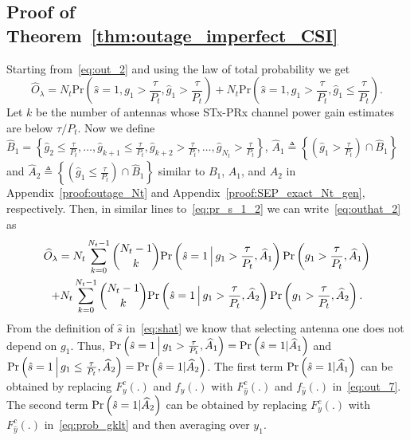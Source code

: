 \documentclass[12pt,draftcls,peerreview,onecolumn]{IEEEtran}
\newcommand{\brac}[1]{\left({#1}\right)}
\newcommand{\define}{\triangleq}
\newcommand{\prob}[1]{\text{Pr}\brac{#1}}
\newcommand{\given}{\arrowvert}
\newcommand{\Given}{\Big\arrowvert}
\newcommand{\nck}[2]{\binom{#1}{#2}}
\newcommand{\setB}{B_1}
\newcommand{\setBhat}{\widehat{B}_1}
\newcommand{\setAgt}{A_1}
\newcommand{\setAlt}{A_2}
\newcommand{\setAgthat}{\widehat{A}_1}
\newcommand{\setAlthat}{\widehat{A}_2}
\newcommand{\lam}{\lambda}
\newcommand{\Nt}{{N_t}}
\newcommand{\Pt}{{P_t}}
\newcommand{\puch}{g}
\newcommand{\gk}[1]{{\puch_{#1}}}
\newcommand{\itau}{\tau}
\newcommand{\out}{O}
\newcommand{\taubypt}{\frac{\itau}{\Pt}}
\newcommand{\gkgrtaubypt}[1]{{\gk{#1}}>\taubypt}
\newcommand{\gklttaubypt}[1]{{\gk{#1}}\leq\taubypt}
\newcommand{\gkhatgrtaubypt}[1]{{\gkhat{#1}}>\taubypt}
\newcommand{\gkhatlttaubypt}[1]{{\gkhat{#1}}\leq\taubypt}
\newcommand{\yk}[1]{y_{#1}}
\newcommand{\outhatlam}{\widehat{\out}_{\lam}}
\newcommand{\ghat}{\hat{\puch}}
\newcommand{\yhat}{\hat{y}}
\newcommand{\shat}{\hat{s}}
\newcommand{\gkhat}[1]{\ghat_{#1}}
\begin{document}
\newcommand{\ccdfyrv}[1]{ F^{c}_{y}\left(#1 \right) }
\newcommand{\ccdfyhatrv}[1]{F^{c}_{\yhat}\left(#1 \right) }
\newcommand{\pdfy}[1]{ f_{y}\left( #1 \right) }
\newcommand{\pdfyhat}[1]{f_{\yhat}\left( #1 \right) }

\subsection{Proof of Theorem~\ref{thm:outage_imperfect_CSI}}
\label{proof:outage_imperfect_CSI}
Starting from~\eqref{eq:out_2} and using the law of total probability we get
\begin{equation}
\outhatlam=\Nt\text{Pr}\brac{\shat=1,\gk{1}>\taubypt,\gkhat{1}>\taubypt} + \Nt\text{Pr}\brac{\shat=1,\gk{1}>\taubypt,\gkhat{1}\leq\taubypt}.
\label{eq:outhat_2}
\end{equation}
Let $k$ be the number of antennas whose STx-PRx channel power gain estimates are below $\itau/\Pt$. Now we define $\setBhat=\left\{\gkhatlttaubypt{2},\dots,\gkhatlttaubypt{k+1},\gkhatgrtaubypt{k+2},\dots,\gkhatgrtaubypt{\Nt}\right\}$, $\setAgthat\define\left\{\left(\gkhatgrtaubypt{1}\right)\cap\setBhat \right\}$ and $\setAlthat\define\left\{\left(\gkhatlttaubypt{1}\right)\cap\setBhat \right\}$ similar to $\setB$, $\setAgt$, and $\setAlt$ in Appendix~\ref{proof:outage_Nt} and Appendix~\ref{proof:SEP_exact_Nt_gen}, respectively. Then, in similar lines to~\eqref{eq:pr_s_1_2} we can write~\eqref{eq:outhat_2}  as
%
\begin{multline}
\outhatlam = \Nt\sum_{k=0}^{\Nt-1} \nck{\Nt-1}{k} 
\prob{\shat = 1 \Given\gkgrtaubypt{1}, \setAgthat } \prob{\gkgrtaubypt{1},\setAgthat}\\ + \Nt\sum_{k=0}^{\Nt-1}\nck{\Nt-1}{k}\prob{\shat = 1 \Given \gkgrtaubypt{1},\setAlthat} \prob{\gkgrtaubypt{1},\setAlthat}. 
\label{eq:pr_s_1_2_imp}
\end{multline}
%
From the definition of $\shat$ in~\eqref{eq:shat} we know that selecting antenna one does not depend on $\gk{1}$. Thus, $\prob{\shat = 1 \Given\gkgrtaubypt{1},\setAgthat}=\prob{\shat = 1 \given \setAgthat}$  and $\prob{\shat = 1 \Given \gklttaubypt{1},\setAlthat}=\prob{\shat = 1 \given \setAlthat}$. The first term $\prob{\shat = 1 \given \setAgthat}$ can be obtained by replacing  $\ccdfyrv{.}$ and $\pdfy{.}$ with $\ccdfyhatrv{.}$ and $\pdfyhat{.}$ in~\eqref{eq:out_7}. The second term $\prob{\shat=1 \given \setAlthat}$ can be obtained by replacing $\ccdfyrv{.}$ with $\ccdfyhatrv{.}$ in~\eqref{eq:prob_gklt} and then averaging over $\yk{1}$. 
\end{document}
